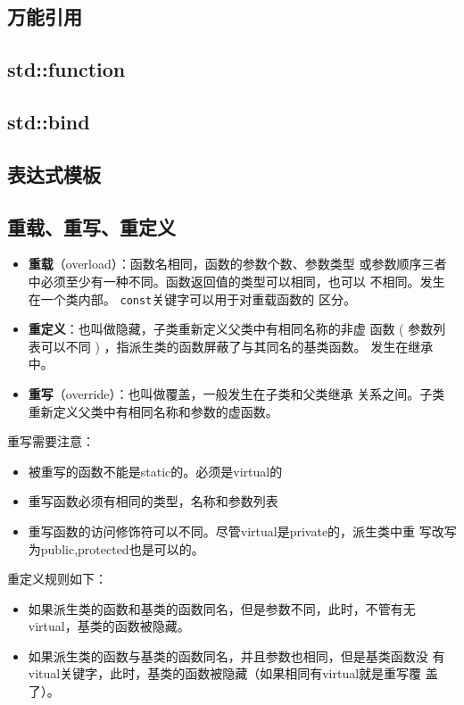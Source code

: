 \subsection{万能引用}

\subsection{std::function}
\label{sec:function}


\subsection{std::bind}
\label{sec:bind}

 
\subsection{表达式模板}
\label{sec:ExpreesionTemp}


\subsection{重载、重写、重定义}
\label{sec:Overload}
\begin{itemize}
\item \textbf{重载}（overload）：函数名相同，函数的参数个数、参数类型
  或参数顺序三者中必须至少有一种不同。函数返回值的类型可以相同，也可以
  不相同。发生在一个类内部。 \texttt{const}关键字可以用于对重载函数的
  区分。 
\item \textbf{重定义}：也叫做隐藏，子类重新定义父类中有相同名称的非虚
  函数 ( 参数列表可以不同 ) ，指派生类的函数屏蔽了与其同名的基类函数。
  发生在继承中。 
\item \textbf{重写}（override）：也叫做覆盖，一般发生在子类和父类继承
  关系之间。子类重新定义父类中有相同名称和参数的虚函数。
\end{itemize}

重写需要注意：
\begin{itemize}
\item 被重写的函数不能是static的。必须是virtual的
\item 重写函数必须有相同的类型，名称和参数列表
\item 重写函数的访问修饰符可以不同。尽管virtual是private的，派生类中重
  写改写为public,protected也是可以的。
\end{itemize}

重定义规则如下：
\begin{itemize}
\item 如果派生类的函数和基类的函数同名，但是参数不同，此时，不管有无
  virtual，基类的函数被隐藏。
\item 如果派生类的函数与基类的函数同名，并且参数也相同，但是基类函数没
  有vitual关键字，此时，基类的函数被隐藏（如果相同有virtual就是重写覆
  盖了）。 
\end{itemize}

